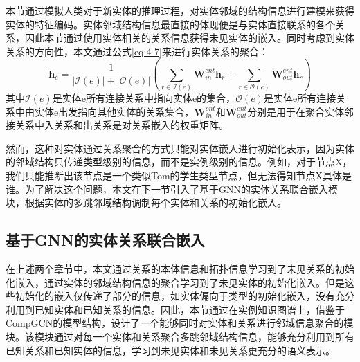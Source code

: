 本节通过模拟人类对于新实体的推理过程，对实体邻域的结构信息进行建模来获得实体的特征编码。实体邻域结构信息最直接的体现便是与实体直接联系的各个关系，因此本节通过使用实体相关的关系信息获得未见实体的嵌入。同时考虑到实体关系的方向性，本文通过公式\ref{eq:4-7}来进行实体关系的聚合：
\begin{equation}
  \textbf{h}_{e} = \frac{1}{|\mathcal{I}(e)| + |\mathcal{O}(e)|} \left(
    \sum_{r\in \mathcal{I}(e)}\textbf{W}_{in}^{ent} \textbf{h}_{r} +
    \sum_{r\in \mathcal{O}(e)}\textbf{W}_{out}^{ent} \textbf{h}_{r}
    \right) \label{eq:4-7}
\end{equation}
其中\(\mathcal{I}(e)\)是实体e所有连接关系中指向实体e的集合，\(\mathcal{O}(e)\)是实体e所有连接关系中由实体e出发指向其他实体的关系集合，\(\textbf{W}_{in}^{ent}\)和\(\textbf{W}_{out}^{ent}\)分别是用于在聚合实体邻接关系中入关系和出关系是对关系嵌入的权重矩阵。

然而，这种对实体通过关系聚合的方式只能对实体嵌入进行初始化表示，因为实体的邻域结构只传递类型级别的信息，而不是实例级别的信息。例如，对于节点X，我们只能推断出该节点是一个类似Tom的学生类型节点，但无法得知节点X具体是谁。为了解决这个问题，本文在下一节引入了基于GNN的实体关系联合嵌入模块，根据实体的多跳邻域结构调制每个实体和关系的初始化嵌入。

\subsection{基于GNN的实体关系联合嵌入}
在上述两个章节中，本文通过关系的本体信息和拓扑信息学习到了未见关系的初始化嵌入，通过实体的邻域结构信息的聚合学习到了未见实体的初始化嵌入。但是这些初始化的嵌入仅传递了部分的信息，如实体偏向于类型的初始化嵌入，没有充分利用到已知实体和已知关系的信息。因此，本节通过在实例知识图谱上，借鉴于CompGCN的模型结构，设计了一个能够同时对实体和关系进行邻域信息聚合的模块。该模块通过对每一个实体和关系聚合多跳邻域结构信息，能够充分利用到所有已知关系和已知实体的信息，学习到未见实体和未见关系更充分的语义表示。


